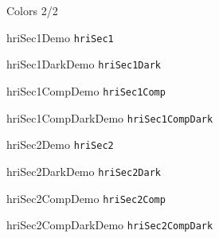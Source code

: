 \documentclass[compress]{beamer}
\begin{document}
\begin{frame}{Colors 2/2}
    \begin{multicols}{2}

        \begin{beamercolorbox}[wd=\linewidth,ht=2ex,dp=0.7ex]{hriSec1Demo}
            \texttt{hriSec1}
        \end{beamercolorbox}
        \begin{beamercolorbox}[wd=\linewidth,ht=2ex,dp=0.7ex]{hriSec1DarkDemo}
            \texttt{hriSec1Dark}
        \end{beamercolorbox}
        \begin{beamercolorbox}[wd=\linewidth,ht=2ex,dp=0.7ex]{hriSec1CompDemo}
            \texttt{hriSec1Comp}
        \end{beamercolorbox}
        \begin{beamercolorbox}[wd=\linewidth,ht=2ex,dp=0.7ex]{hriSec1CompDarkDemo}
            \texttt{hriSec1CompDark}
        \end{beamercolorbox}

        \begin{beamercolorbox}[wd=\linewidth,ht=2ex,dp=0.7ex]{hriSec2Demo}
            \texttt{hriSec2}
        \end{beamercolorbox}
        \begin{beamercolorbox}[wd=\linewidth,ht=2ex,dp=0.7ex]{hriSec2DarkDemo}
            \texttt{hriSec2Dark}
        \end{beamercolorbox}
        \begin{beamercolorbox}[wd=\linewidth,ht=2ex,dp=0.7ex]{hriSec2CompDemo}
            \texttt{hriSec2Comp}
        \end{beamercolorbox}
        \begin{beamercolorbox}[wd=\linewidth,ht=2ex,dp=0.7ex]{hriSec2CompDarkDemo}
            \texttt{hriSec2CompDark}
        \end{beamercolorbox}


\end{multicols}
\end{frame}
\end{document}
